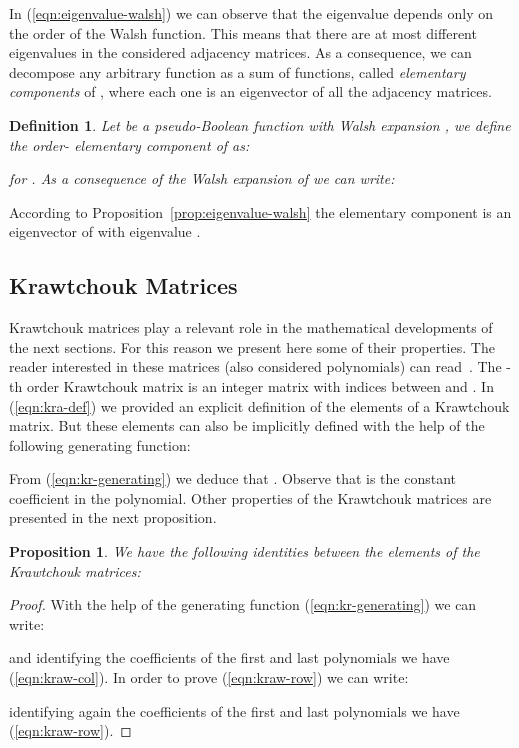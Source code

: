 \documentclass{article}
\newtheorem{definition}{Definition}
\newtheorem{proposition}{Proposition}
\begin{document}
In (\ref{eqn:eigenvalue-walsh}) we can observe that the eigenvalue depends only on the order  of the Walsh function. This means that there are at most  different eigenvalues in the considered adjacency matrices. As a consequence, we can decompose any arbitrary function  as a sum of  functions, called \emph{elementary components} of , where each one is an eigenvector of all the adjacency matrices. 

\begin{definition}
Let  be a pseudo-Boolean function with Walsh expansion , we define the order- elementary component of  as:

for . As a consequence of the Walsh expansion of  we can write:

\end{definition}

According to Proposition~\ref{prop:eigenvalue-walsh} the elementary component  is an eigenvector of  with eigenvalue .

\subsection{Krawtchouk Matrices}

Krawtchouk matrices play a relevant role in the mathematical developments of the next sections. For this reason we present here some of their properties. The reader interested in these matrices (also considered polynomials) can read~\cite{Feinsilver2005}. The -th order Krawtchouk matrix is an  integer matrix with indices between  and . In (\ref{eqn:kra-def}) we provided an explicit definition of the elements of a Krawtchouk matrix. But these elements can also be implicitly defined with the help of the following generating function:


From (\ref{eqn:kr-generating}) we deduce that . Observe that  is the constant coefficient in the polynomial. Other properties of the Krawtchouk matrices are presented in the next proposition.
\begin{proposition}
\label{prop:kraw-col}
We have the following identities between the elements of the Krawtchouk matrices:



\end{proposition}
\begin{proof}
With the help of the generating function (\ref{eqn:kr-generating}) we can write:

and identifying the coefficients of the first and last polynomials we have (\ref{eqn:kraw-col}). In order to prove (\ref{eqn:kraw-row}) we can write:

identifying again the coefficients of the first and last polynomials we have (\ref{eqn:kraw-row}).
\end{proof}
\end{document}
